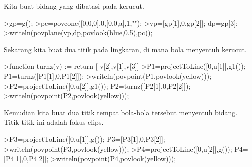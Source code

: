 \documentclass[a4paper,10pt]{article}
\begin{document}
\begin{eulernotebook}
\begin{eulercomment}
\begin{eulercomment}
\begin{eulercomment}
\begin{eulercomment}
\begin{eulercomment}
\begin{eulercomment}
\begin{eulercomment}
\begin{eulercomment}
\begin{eulercomment}
\begin{eulercomment}
\begin{eulercomment}
\begin{eulercomment}
\begin{eulercomment}
\begin{eulercomment}
\begin{eulercomment}
\begin{eulercomment}
\begin{eulercomment}
\begin{eulercomment}
\begin{eulercomment}
\begin{eulercomment}
\begin{eulercomment}
\begin{eulercomment}
\begin{eulercomment}
\begin{eulercomment}
\begin{eulercomment}
\begin{eulercomment}
\begin{eulercomment}
\begin{eulercomment}
\begin{eulercomment}
\begin{eulercomment}
\begin{eulercomment}
\begin{eulercomment}
\begin{eulercomment}
\begin{eulercomment}
\begin{eulercomment}
\begin{eulercomment}
\begin{eulercomment}
\begin{eulercomment}
\begin{eulercomment}
\begin{eulercomment}
\begin{eulercomment}
\begin{eulercomment}
\begin{eulerprompt}
\end{eulerprompt}
\begin{eulercomment}
Kita buat bidang yang dibatasi pada kerucut.
\end{eulercomment}
\begin{eulerprompt}
>gp=g();
>pc=povcone([0,0,0],0,[0,0,a],1,"");
>vp=[gp[1],0,gp[2]]; dp=gp[3];
>writeln(povplane(vp,dp,povlook(blue,0.5),pc));
\end{eulerprompt}
\begin{eulercomment}
Sekarang kita buat dua titik pada lingkaran, di mana bola menyentuh
kerucut.
\end{eulercomment}
\begin{eulerprompt}
>function turnz(v) := return [-v[2],v[1],v[3]]
>P1=projectToLine([0,u[1]],g1()); P1=turnz([P1[1],0,P1[2]]);
>writeln(povpoint(P1,povlook(yellow)));
>P2=projectToLine([0,u[2]],g1()); P2=turnz([P2[1],0,P2[2]]);
>writeln(povpoint(P2,povlook(yellow)));
\end{eulerprompt}
\begin{eulercomment}
Kemudian kita buat dua titik tempat bola-bola tersebut menyentuh
bidang. Titik-titik ini adalah fokus elips.
\end{eulercomment}
\begin{eulerprompt}
>P3=projectToLine([0,u[1]],g()); P3=[P3[1],0,P3[2]];
>writeln(povpoint(P3,povlook(yellow)));
>P4=projectToLine([0,u[2]],g()); P4=[P4[1],0,P4[2]];
>writeln(povpoint(P4,povlook(yellow)));
\end{eulerprompt}
\begin{eulercomment}

\end{eulercomment}
\end{eulercomment}
\end{eulercomment}
\end{eulercomment}
\end{eulercomment}
\end{eulercomment}
\end{eulercomment}
\end{eulercomment}
\end{eulercomment}
\end{eulercomment}
\end{eulercomment}
\end{eulercomment}
\end{eulercomment}
\end{eulercomment}
\end{eulercomment}
\end{eulercomment}
\end{eulercomment}
\end{eulercomment}
\end{eulercomment}
\end{eulercomment}
\end{eulercomment}
\end{eulercomment}
\end{eulercomment}
\end{eulercomment}
\end{eulercomment}
\end{eulercomment}
\end{eulercomment}
\end{eulercomment}
\end{eulercomment}
\end{eulercomment}
\end{eulercomment}
\end{eulercomment}
\end{eulercomment}
\end{eulercomment}
\end{eulercomment}
\end{eulercomment}
\end{eulercomment}
\end{eulercomment}
\end{eulercomment}
\end{eulercomment}
\end{eulercomment}
\end{eulercomment}
\end{eulercomment}
\end{eulernotebook}
\end{document}
